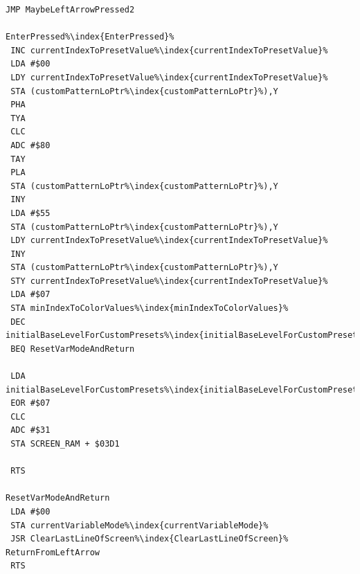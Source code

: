 \begin{minipage}[b]{0.33\linewidth}
\begin{lrbox}{\mybox}
\begin{lstlisting}[basicstyle=\ttfamily\tiny,escapechar=\%]
 JMP MaybeLeftArrowPressed2

EnterPressed%\index{EnterPressed}%
 INC currentIndexToPresetValue%\index{currentIndexToPresetValue}%
 LDA #$00
 LDY currentIndexToPresetValue%\index{currentIndexToPresetValue}%
 STA (customPatternLoPtr%\index{customPatternLoPtr}%),Y
 PHA
 TYA
 CLC
 ADC #$80
 TAY
 PLA
 STA (customPatternLoPtr%\index{customPatternLoPtr}%),Y
 INY
 LDA #$55
 STA (customPatternLoPtr%\index{customPatternLoPtr}%),Y
 LDY currentIndexToPresetValue%\index{currentIndexToPresetValue}%
 INY
 STA (customPatternLoPtr%\index{customPatternLoPtr}%),Y
 STY currentIndexToPresetValue%\index{currentIndexToPresetValue}%
 LDA #$07
 STA minIndexToColorValues%\index{minIndexToColorValues}%
 DEC initialBaseLevelForCustomPresets%\index{initialBaseLevelForCustomPresets}%
 BEQ ResetVarModeAndReturn

 LDA initialBaseLevelForCustomPresets%\index{initialBaseLevelForCustomPresets}%
 EOR #$07
 CLC
 ADC #$31
 STA SCREEN_RAM + $03D1

 RTS

ResetVarModeAndReturn
 LDA #$00
 STA currentVariableMode%\index{currentVariableMode}%
 JSR ClearLastLineOfScreen%\index{ClearLastLineOfScreen}%
ReturnFromLeftArrow
 RTS

\end{lstlisting}
\end{lrbox}%
\scalebox{0.8}{\usebox{\mybox}}
\end{minipage}
